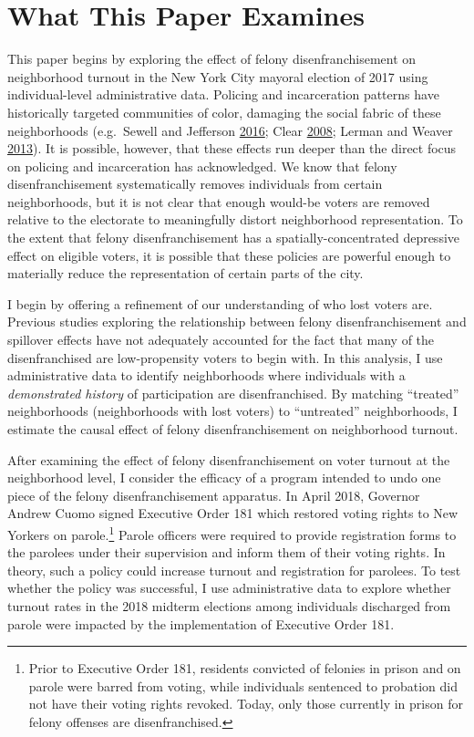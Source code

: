 \documentclass[
  12pt,
]{article}
\begin{document}
\hypertarget{what-this-paper-examines}{%
\section{What This Paper Examines}\label{what-this-paper-examines}}

This paper begins by exploring the effect of felony disenfranchisement on neighborhood turnout in the New York City mayoral election of 2017 using individual-level administrative data. Policing and incarceration patterns have historically targeted communities of color, damaging the social fabric of these neighborhoods (e.g.~Sewell and Jefferson \protect\hyperlink{ref-Sewell2016}{2016}; Clear \protect\hyperlink{ref-Clear2008}{2008}; Lerman and Weaver \protect\hyperlink{ref-Lerman2013}{2013}). It is possible, however, that these effects run deeper than the direct focus on policing and incarceration has acknowledged. We know that felony disenfranchisement systematically removes individuals from certain neighborhoods, but it is not clear that enough would-be voters are removed relative to the electorate to meaningfully distort neighborhood representation. To the extent that felony disenfranchisement has a spatially-concentrated depressive effect on eligible voters, it is possible that these policies are powerful enough to materially reduce the representation of certain parts of the city.

I begin by offering a refinement of our understanding of who lost voters are. Previous studies exploring the relationship between felony disenfranchisement and spillover effects have not adequately accounted for the fact that many of the disenfranchised are low-propensity voters to begin with. In this analysis, I use administrative data to identify neighborhoods where individuals with a \emph{demonstrated history} of participation are disenfranchised. By matching ``treated'' neighborhoods (neighborhoods with lost voters) to ``untreated'' neighborhoods, I estimate the causal effect of felony disenfranchisement on neighborhood turnout.

After examining the effect of felony disenfranchisement on voter turnout at the neighborhood level, I consider the efficacy of a program intended to undo one piece of the felony disenfranchisement apparatus. In April 2018, Governor Andrew Cuomo signed Executive Order 181 which restored voting rights to New Yorkers on parole.\footnote{Prior to Executive Order 181, residents convicted of felonies in prison and on parole were barred from voting, while individuals sentenced to probation did not have their voting rights revoked. Today, only those currently in prison for felony offenses are disenfranchised.} Parole officers were required to provide registration forms to the parolees under their supervision and inform them of their voting rights. In theory, such a policy could increase turnout and registration for parolees. To test whether the policy was successful, I use administrative data to explore whether turnout rates in the 2018 midterm elections among individuals discharged from parole were impacted by the implementation of Executive Order 181.
\end{document}
